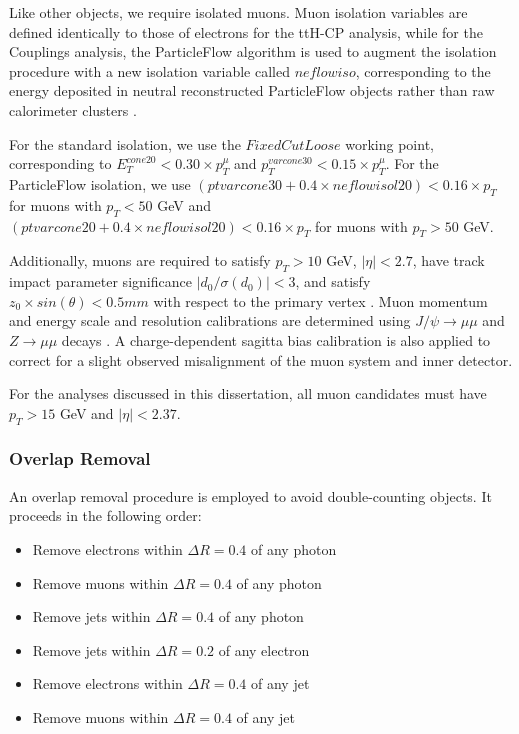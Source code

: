 Like other objects, we require isolated muons. Muon isolation variables are defined identically to those of electrons for the ttH-CP analysis, while for the Couplings analysis, the ParticleFlow algorithm is used to augment the isolation procedure with a new isolation variable called $neflowiso$, corresponding to the energy deposited in neutral reconstructed ParticleFlow objects rather than raw calorimeter clusters \cite{ATL-COM-PHYS-2019-177}. 

For the standard isolation, we use the $FixedCutLoose$ working point, corresponding to $E_{T}^{cone20}<0.30 \times p_{T}^{\mu}$ and $p_{T}^{varcone30}<0.15 \times p_{T}^{\mu}$. For the ParticleFlow isolation, we use $(ptvarcone30+ 0.4\times neflowisol20) <0.16 \times p_{T}$ for muons with $p_{T} < 50$ GeV and $(ptvarcone20+ 0.4\times neflowisol20) < 0.16 \times p_{T}$ for muons with $p_{T} > 50$ GeV.

Additionally, muons are required to satisfy $p_{T} > 10$ GeV, $|\eta| < 2.7$, have track impact parameter significance $|d_{0} / \sigma(d_{0})| < 3$, and satisfy $z_{0} \times sin(\theta) < 0.5 mm$ with respect to the primary vertex \cite{ATL-COM-PHYS-2020-378}. Muon momentum and energy scale and resolution calibrations are determined using $J/\psi \rightarrow \mu \mu$ and $Z \rightarrow \mu \mu$ decays \cite{CERN-EP-2016-033}. A charge-dependent sagitta bias calibration is also applied to correct for a slight observed misalignment of the muon system and inner detector.

For the analyses discussed in this dissertation, all muon candidates must have $p_{T} > 15$ GeV and $|\eta| < 2.37$.
 
\subsubsection{Overlap Removal} \label{sec:Overlap}

An overlap removal procedure is employed to avoid double-counting objects. It proceeds in the following order:

\begin{itemize}
\item Remove electrons within $\Delta R=0.4$ of any photon
\item Remove muons within $\Delta R=0.4$ of any photon
\item Remove jets within $\Delta R=0.4$ of any photon
\item Remove jets within $\Delta R=0.2$ of any electron
\item Remove electrons within $\Delta R=0.4$ of any jet
\item Remove muons within $\Delta R=0.4$ of any jet
\end{itemize}

